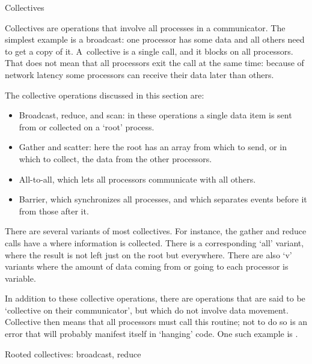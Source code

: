 
 {Collectives}
\label{sec:collective}

Collectives are operations that involve all processes in a
communicator. The simplest example is a broadcast: one processor has
some data and all others need to get a copy of it.  A~collective is a
single call, and it blocks on all processors. That does not mean that
all processors exit the call at the same time: because of network
latency some processors can receive their data later than others.

The collective operations discussed in this section are:
\begin{itemize}
\item Broadcast, reduce, and scan: in these operations a single data
  item is sent from or collected on a `root' process.
\item Gather and scatter: here the root has an array from which to
  send, or in which to collect, the data from the other processors.
\item All-to-all, which lets all processors communicate with all others.
\item Barrier, which synchronizes all processes, and which separates
  events before it from those after it.
\end{itemize}
There are several variants of most collectives. For instance, the
gather and reduce calls have
a  where
information is collected.  There is a corresponding `all' variant,
where the result is not left just on the root but everywhere. 
There are also `v' variants where the
amount of data coming from or going to each processor is variable.

In addition to these collective operations, there are operations that
are said to be `collective on their communicator', but which do not
involve data movement. Collective then means that all processors must
call this routine; not to do so is an error that will probably
manifest itself in `hanging' code. One such example is
.

 {Rooted collectives: broadcast, reduce}
\label{sec:bcast}

